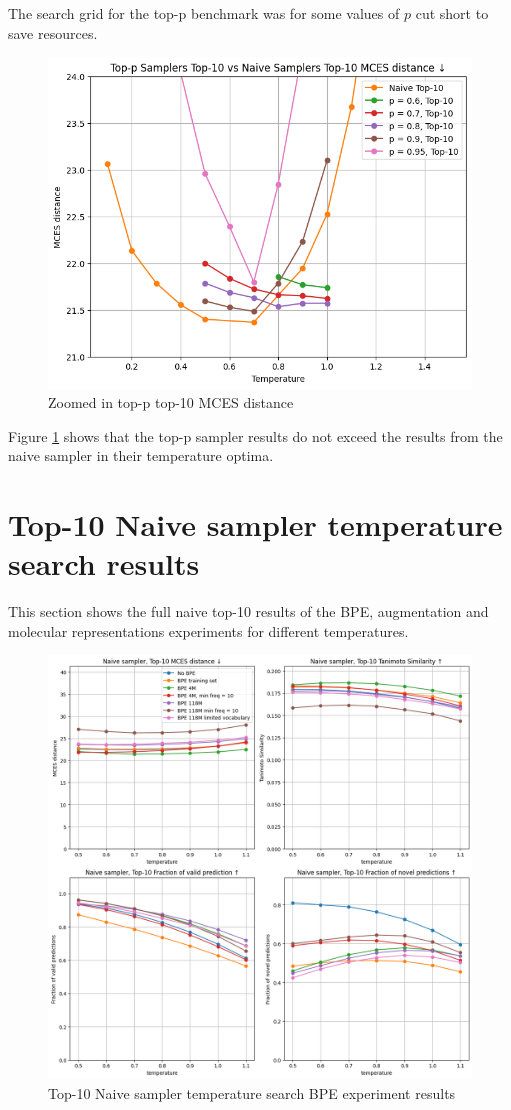 The search grid for the top-p benchmark was for some values of $p$ cut short to save resources.

\begin{figure}[h]
    \centering
    \includegraphics[width=0.6\linewidth]{figures/appendix/samplers/top-p_vs_naive_top-10.png}
    \caption{Zoomed in top-p top-10 MCES distance}
    \label{fig:top-p_zoomed_appendix}
\end{figure}

Figure \ref{fig:top-p_zoomed_appendix} shows that the top-p sampler results do not exceed the results from the naive sampler in their temperature optima.


\section{Top-10 Naive sampler temperature search results}
This section shows the full naive top-10 results of the \ac{BPE}, augmentation and molecular representations experiments for different temperatures.
\label{sec:temp_search_appendix}

\begin{figure}[h]
    \centering
    \includegraphics[width=1.0\textwidth]{figures/appendix/bpe_with_tanimoto.png}
    \caption{Top-10 Naive sampler temperature search BPE experiment results}
    \label{fig:bpe_appendix}
\end{figure}

